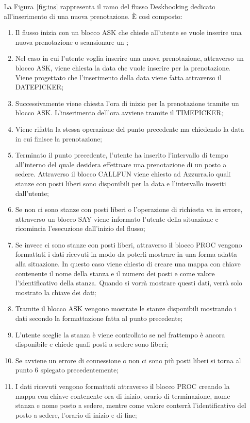La Figura~\ref{fig:ins} rappresenta il ramo del flusso Deskbooking dedicato all'inserimento di una nuova prenotazione. È così composto:
\begin{enumerate}
	\item Il flusso inizia con un blocco ASK che chiede all'utente se vuole inserire una nuova prenotazione o scansionare un ;
	\item Nel caso in cui l'utente voglia inserire una nuova prenotazione, attraverso un blocco ASK, viene chiesta la data che vuole inserire per la prenotazione. Viene progettato che l'inserimento della data viene fatta attraverso il DATEPICKER;
	\item Successivamente viene chiesta l'ora di inizio per la prenotazione tramite un blocco ASK. L'inserimento dell'ora avviene tramite il TIMEPICKER;
	\item Viene rifatta la stessa operazione del punto precedente ma chiedendo la data in cui finisce la prenotazione;
	\item Terminato il punto precedente, l'utente ha inserito l'intervallo di tempo all'interno del quale desidera effettuare una prenotazione di un posto a sedere. Attraverso il blocco CALLFUN viene chiesto ad Azzurra.io quali stanze con posti liberi sono disponibili per la data e l'intervallo inseriti dall'utente;
	\item Se non ci sono stanze con posti liberi o l'operazione di richiesta va in errore, attraverso un blocco SAY viene informato l'utente della situazione e ricomincia l'esecuzione dall'inizio del flusso;
	\item Se invece ci sono stanze con posti liberi, attraverso il blocco PROC vengono formattati i dati ricevuti in modo da poterli mostrare in una forma adatta alla situazione. In questo caso viene chiesto di creare una mappa con chiave contenente il nome della stanza e il numero dei posti e come valore l'identificativo della stanza. Quando si vorrà mostrare questi dati, verrà solo mostrato la chiave dei dati;
	\item Tramite il blocco ASK vengono mostrate le stanze disponibili mostrando i dati secondo la formattazione fatta al punto precedente;
	\item L'utente sceglie la stanza è viene controllato se nel frattempo è ancora disponibile e chiede quali posti a sedere sono liberi;
	\item Se avviene un errore di connessione o non ci sono più posti liberi si torna al punto 6 spiegato precedentemente;
	\item I dati ricevuti vengono formattati attraverso il blocco PROC creando la mappa con chiave contenente ora di inizio, orario di terminazione, nome stanza e nome posto a sedere, mentre come valore conterrà l'identificativo del posto a sedere, l'orario di inizio e di fine;

\end{enumerate}

